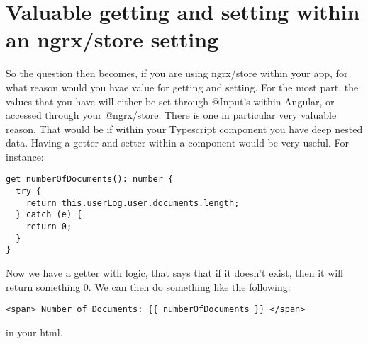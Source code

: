 \section{ Valuable getting and setting within an ngrx/store setting }
So the question then becomes, if you are using ngrx/store within your app, for
what reason would you hvae value for getting and setting. For the most part, the
values that you have will either be set through @Input's within Angular, or
accessed through your @ngrx/store. There is one in particular very valuable
reason. That would be if within your Typescript component you have deep nested
data. Having a getter and setter within a component would be very useful. For
instance:
\begin{lstlisting}
get numberOfDocuments(): number {
  try {
    return this.userLog.user.documents.length;
  } catch (e) {
    return 0;
  }
}
\end{lstlisting}
Now we have a getter with logic, that says that if it doesn't exist, then it
will return something 0. We can then do something like the following:
\begin{verbatim}
<span> Number of Documents: {{ numberOfDocuments }} </span>
\end{verbatim}
in your html.
